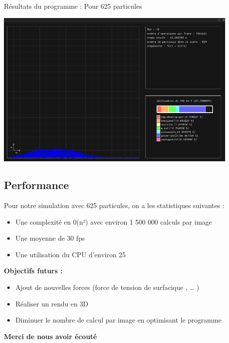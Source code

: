 \documentclass{article}
\begin{document}
\newpage
\vspace*{2pt}
\thispagestyle{landscape}
Résultats du programme : Pour 625 particules 
\begin{center}
    \includegraphics[width=0.9\textwidth]{R_Frame6.png}
\end{center}

\newpage
\vspace*{2pt}
\thispagestyle{landscape}
\subsection{Performance}
Pour notre simulation avec 625 particules, on a les statistiques suivantes  :
\begin{itemize}
    \item Une complexité en 0(n²) avec environ 1 500 000 calculs par image
    \item Une moyenne de 30 fps 
    \item Une utilisation du CPU d’environ 25 %
\end{itemize}

\newpage
\vspace*{2pt}
\thispagestyle{landscape}
\textbf{Objectifs futurs :}
\begin{itemize}
    \item Ajout de nouvelles forces (force de tension de surfacique ,   … )
    \item Réaliser un rendu en 3D
    \item Diminuer le nombre de calcul par image en optimisant le programme
\end{itemize}

\newpage
\vspace*{2pt}
\thispagestyle{landscape}
\vspace{\fill}
\begin{center}
    \Huge
    \textbf{Merci de nous avoir écouté}
\end{center}
\vspace{\fill}
\end{document}
